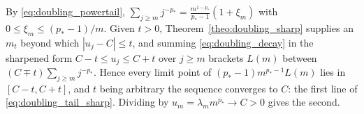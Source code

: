 By \eqref{eq:doubling_powertail}, $\sum_{j\geq m}j^{-p_*}=\frac{m^{1-p_*}}{p_*-1}(1+\xi_m)$
with $0\leq\xi_m\leq(p_*-1)/m$. Given $t>0$, Theorem~\ref{theo:doubling_sharp} supplies an
$m_t$ beyond which $|u_j-C|\leq t$, and summing \eqref{eq:doubling_decay} in the sharpened
form $C-t\leq u_j\leq C+t$ over $j\geq m$ brackets $L(m)$ between $(C\mp t)\sum_{j\geq
m}j^{-p_*}$. Hence every limit point of $(p_*-1)m^{p_*-1}L(m)$ lies in $[C-t,C+t]$, and $t$
being arbitrary the sequence converges to $C$: the first line of
\eqref{eq:doubling_tail_sharp}. Dividing by $u_m=\lambda_m m^{p_*}\rightarrow C>0$ gives the
second.
